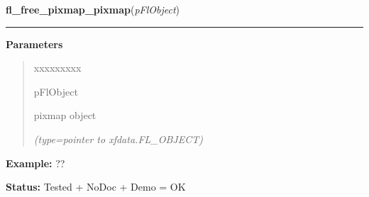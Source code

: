 \hspace{.8\funcindent}\begin{boxedminipage}{\funcwidth}

    \raggedright \textbf{fl\_free\_pixmap\_pixmap}(\textit{pFlObject})

    \vspace{-1.5ex}

    \rule{\textwidth}{0.5\fboxrule}
\setlength{\parskip}{2ex}
\setlength{\parskip}{1ex}
      \textbf{Parameters}
      \vspace{-1ex}

      \begin{quote}
        \begin{Ventry}{xxxxxxxxx}

          \item[pFlObject]

          pixmap object

            {\it (type=pointer to xfdata.FL\_OBJECT)}

        \end{Ventry}

      \end{quote}

\textbf{Example:} ??



\textbf{Status:} Tested + NoDoc + Demo = OK



    \end{boxedminipage}

    \label{xformslib:flbitmap:fl_free_pixmap_pixmap}

    \vspace{0.5ex}

